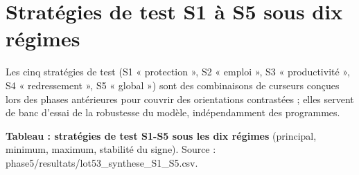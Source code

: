 \documentclass[
  11pt,
  11pt,
  a4paper,
  openany]{book}
\begin{document}
\hypertarget{sec:s1s5}{%
\section{Stratégies de test S1 à S5 sous dix régimes}\label{sec:s1s5}}

Les cinq stratégies de test (S1 « protection », S2 « emploi », S3 «
productivité », S4 « redressement », S5 « global ») sont des
combinaisons de curseurs conçues lors des phases antérieures pour
couvrir des orientations contrastées ; elles servent de banc d'essai de
la robustesse du modèle, indépendamment des programmes.

\textbf{Tableau : stratégies de test S1-S5 sous les dix régimes}
(principal, minimum, maximum, stabilité du signe). Source :
phase5/resultats/lot53\_synthese\_S1\_S5.csv.
\end{document}
